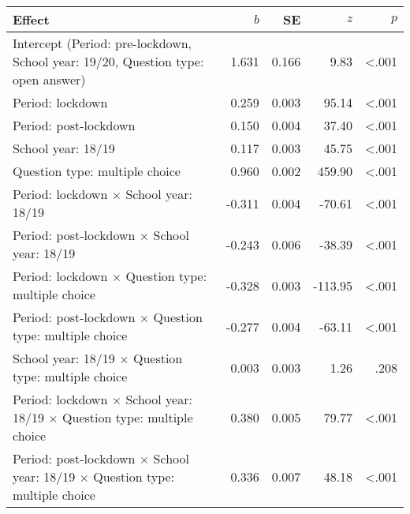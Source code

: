 
\begin{tabular}{lrrrr}
\toprule
Effect & $b$ & SE & $z$ & $p$\\
\midrule
Intercept \small{(Period: pre-lockdown, School year: 19/20, Question type: open answer)} & 1.631 & 0.166 & 9.83 & <.001\\
Period: lockdown & 0.259 & 0.003 & 95.14 & <.001\\
Period: post-lockdown & 0.150 & 0.004 & 37.40 & <.001\\
School year: 18/19 & 0.117 & 0.003 & 45.75 & <.001\\
Question type: multiple choice & 0.960 & 0.002 & 459.90 & <.001\\
\addlinespace
Period: lockdown $\times$ School year: 18/19 & -0.311 & 0.004 & -70.61 & <.001\\
Period: post-lockdown $\times$ School year: 18/19 & -0.243 & 0.006 & -38.39 & <.001\\
Period: lockdown $\times$ Question type: multiple choice & -0.328 & 0.003 & -113.95 & <.001\\
Period: post-lockdown $\times$ Question type: multiple choice & -0.277 & 0.004 & -63.11 & <.001\\
School year: 18/19 $\times$ Question type: multiple choice & 0.003 & 0.003 & 1.26 & .208\\
\addlinespace
Period: lockdown $\times$ School year: 18/19 $\times$ Question type: multiple choice & 0.380 & 0.005 & 79.77 & <.001\\
Period: post-lockdown $\times$ School year: 18/19 $\times$ Question type: multiple choice & 0.336 & 0.007 & 48.18 & <.001\\
\bottomrule
\end{tabular}